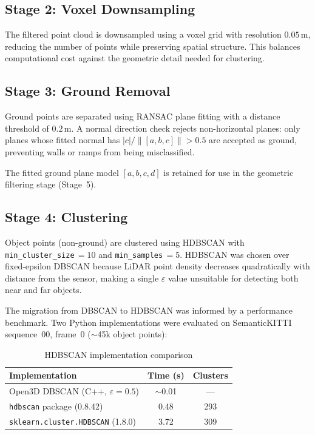 \documentclass[a4paper, 12pt]{article}
\begin{document}
\subsection{Stage 2: Voxel Downsampling}

The filtered point cloud is downsampled using a voxel grid with resolution $0.05$\,m, reducing the number of points while preserving spatial structure. This balances computational cost against the geometric detail needed for clustering.

\subsection{Stage 3: Ground Removal}

Ground points are separated using RANSAC plane fitting with a distance threshold of $0.2$\,m. A normal direction check rejects non-horizontal planes: only planes whose fitted normal has $|c| / \|[a,b,c]\| > 0.5$ are accepted as ground, preventing walls or ramps from being misclassified.

The fitted ground plane model $[a, b, c, d]$ is retained for use in the geometric filtering stage (Stage~5).

\subsection{Stage 4: Clustering}

Object points (non-ground) are clustered using HDBSCAN with \texttt{min\_cluster\_size}$\,=10$ and \texttt{min\_samples}$\,=5$. HDBSCAN was chosen over fixed-epsilon DBSCAN because LiDAR point density decreases quadratically with distance from the sensor, making a single $\varepsilon$ value unsuitable for detecting both near and far objects.

The migration from DBSCAN to HDBSCAN was informed by a performance benchmark. Two Python implementations were evaluated on SemanticKITTI sequence~00, frame~0 ($\sim$45k object points):

\begin{table}[H]
\centering
\caption{HDBSCAN implementation comparison}
\begin{tabular}{lcc}
\toprule
\textbf{Implementation} & \textbf{Time (s)} & \textbf{Clusters} \\
\midrule
Open3D DBSCAN (C++, $\varepsilon=0.5$) & $\sim$0.01 & --- \\
\texttt{hdbscan} package (0.8.42)      & 0.48       & 293 \\
\texttt{sklearn.cluster.HDBSCAN} (1.8.0) & 3.72     & 309 \\
\bottomrule
\end{tabular}
\end{table}
\end{document}
